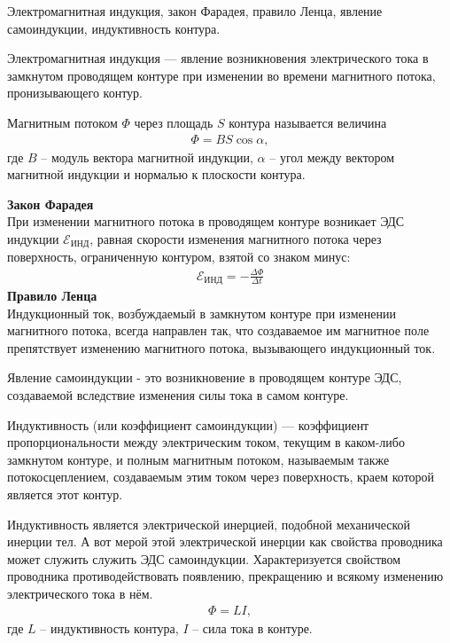 \documentclass[__main__.tex]{subfiles}
\begin{document}
Электромагнитная индукция, закон Фарадея, правило Ленца, явление самоиндукции, индуктивность контура.\\ 

\begin{definition}
Электромагнитная индукция --- явление возникновения электрического тока в замкнутом проводящем контуре при изменении во времени магнитного потока, пронизывающего контур.
\end{definition}
\begin{definition}
Магнитным потоком $\Phi$ через площадь $S$ контура называется величина 
\begin{gather*}
\Phi = BS\cos\alpha,
\end{gather*}
где $B$ -- модуль вектора магнитной индукции, $\alpha$ -- угол между вектором магнитной индукции и нормалью к плоскости контура.
\end{definition}

\textbf{Закон Фарадея}\\
При изменении магнитного потока в проводящем контуре возникает ЭДС индукции $\mathcal E_{\text{ИНД}}$, равная скорости изменения магнитного потока через поверхность, ограниченную контуром, взятой со знаком минус:
\begin{gather*}
\mathcal E_{\text{ИНД}}=-\frac{\Delta \Phi}{\Delta t}
\end{gather*}
\textbf{Правило Ленца}\\
Индукционный ток, возбуждаемый в замкнутом контуре при изменении магнитного потока, всегда направлен так, что создаваемое им магнитное поле препятствует изменению магнитного потока, вызывающего индукционный ток.\\

\begin{definition}
Явление самоиндукции - это возникновение в проводящем контуре ЭДС, создаваемой вследствие изменения силы тока в самом контуре.
\end{definition}
\begin{definition}
Индуктивность (или коэффициент самоиндукции) — коэффициент пропорциональности между электрическим током, текущим в каком-либо замкнутом контуре, и полным магнитным потоком, называемым также потокосцеплением, создаваемым этим током через поверхность, краем которой является этот контур.

Индуктивность является электрической инерцией, подобной механической инерции тел. А вот мерой этой электрической инерции как свойства проводника может служить служить ЭДС самоиндукции. Характеризуется свойством проводника противодействовать появлению, прекращению и всякому изменению электрического тока в нём.
\begin{gather*}
\Phi=LI,
\end{gather*}
где $L$ -- индуктивность контура, $I$ -- сила тока в контуре.
\end{definition}
\end{document}

